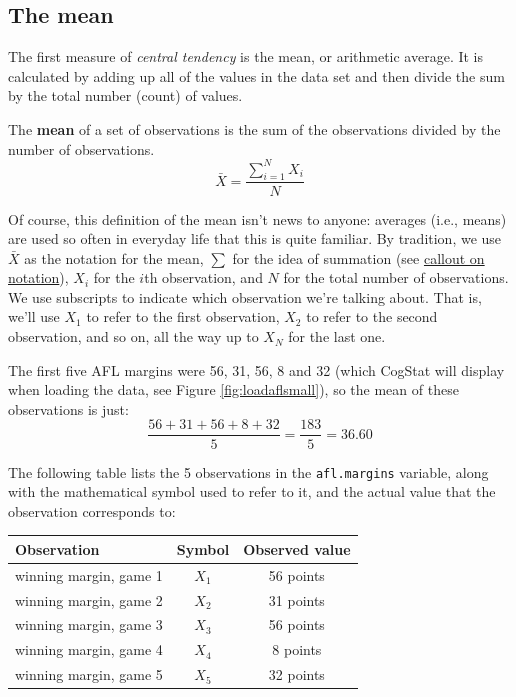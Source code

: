 \documentclass[
  11pt,
  a4paper,
  twoside,symmetric,openright]{book}
\theoremstyle{break}
\theoremstyle{break}
\begin{document}
\hypertarget{mean}{%
\subsection{The mean}\label{mean}}

The first measure of \emph{central tendency} is the mean, or arithmetic average. It is calculated by adding up all of the values in the data set and then divide the sum by the total number (count) of values.

\begin{definition}[Mean]
\protect\hypertarget{def:defmean}{}\label{def:defmean}The \textbf{mean} of a set of observations is the sum of the observations divided by the number of observations.
\[
\bar{X} = \frac{\sum_{i=1}^N X_i}{N}
\]
\end{definition}

Of course, this definition of the mean isn't news to anyone: averages (i.e., means) are used so often in everyday life that this is quite familiar. By tradition, we use \(\bar{X}\) as the notation for the mean, \(\scriptstyle\sum\) for the idea of summation (see \protect\hyperlink{summation}{callout on notation}), \(X_i\) for the \(i\)th observation, and \(N\) for the total number of observations. We use subscripts to indicate which observation we're talking about. That is, we'll use \(X_1\) to refer to the first observation, \(X_2\) to refer to the second observation, and so on, all the way up to \(X_N\) for the last one.

\begin{example}[Mean]
\protect\hypertarget{exm:exmean}{}\label{exm:exmean}

The first five AFL margins were 56, 31, 56, 8 and 32 (which CogStat will display when loading the data, see Figure \ref{fig:loadaflsmall}), so the mean of these observations is just:
\[
\frac{56 + 31 + 56 + 8 + 32}{5} = \frac{183}{5} = 36.60
\]

The following table lists the 5 observations in the \texttt{afl.margins} variable, along with the mathematical symbol used to refer to it, and the actual value that the observation corresponds to:

\begin{table}[H]
\centering
\begin{tabular}{lcc}
\toprule
Observation & Symbol & Observed value\\
\midrule
winning margin, game 1 & $X_1$ & 56 points\\
winning margin, game 2 & $X_2$ & 31 points\\
winning margin, game 3 & $X_3$ & 56 points\\
winning margin, game 4 & $X_4$ & 8 points\\
winning margin, game 5 & $X_5$ & 32 points\\
\bottomrule
\end{tabular}
\end{table}

\end{example}
\end{document}
